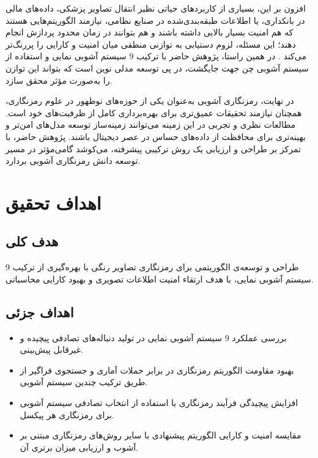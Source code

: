 افزون بر این، بسیاری از کاربردهای حیاتی نظیر انتقال تصاویر پزشکی، داده‌های مالی در بانکداری، یا اطلاعات طبقه‌بندی‌شده در صنایع نظامی، نیازمند الگوریتم‌هایی هستند که هم امنیت بسیار بالایی داشته باشند و هم بتوانند در زمان محدود پردازش انجام دهند؛ این مسئله، لزوم دستیابی به توازنی منطقی میان امنیت و کارایی را پررنگ‌تر می‌کند \cite{ref5}. در همین راستا، پژوهش حاضر با ترکیب 9 سیستم آشوبی نمایی و استفاده از سیستم آشوبی چن جهت جایگشت، در پی توسعه مدلی نوین است که بتواند این توازن را به‌صورت مؤثر محقق سازد.

در نهایت، رمزنگاری آشوبی به‌عنوان یکی از حوزه‌های نوظهور در علوم رمزنگاری، همچنان نیازمند تحقیقات عمیق‌تری برای بهره‌برداری کامل از ظرفیت‌های خود است. مطالعات نظری و تجربی در این زمینه می‌توانند زمینه‌ساز توسعه مدل‌های امن‌تر و بهینه‌تری برای محافظت از داده‌های حساس در عصر دیجیتال باشند. پژوهش حاضر، با تمرکز بر طراحی و ارزیابی یک روش ترکیبی پیشرفته، می‌کوشد گامی‌مؤثر در مسیر توسعه دانش رمزنگاری آشوبی بردارد.

\section{اهداف تحقیق}
\subsection{هدف کلی}
طراحی و توسعه‌ی الگوریتمی برای رمزنگاری تصاویر رنگی با بهره‌گیری از ترکیب 9 سیستم آشوبی نمایی، با هدف ارتقاء امنیت اطلاعات تصویری و بهبود کارایی محاسباتی.

\subsection{اهداف جزئی}
\begin{itemize}
    \item بررسی عملکرد 9 سیستم آشوبی نمایی در تولید دنباله‌های تصادفی پیچیده و غیرقابل پیش‌بینی.
    \item بهبود مقاومت الگوریتم رمزنگاری در برابر حملات آماری و جستجوی فراگیر از طریق ترکیب چندین سیستم آشوبی.
    \item افزایش پیچیدگی فرآیند رمزنگاری با استفاده از انتخاب تصادفی سیستم آشوبی برای رمزنگاری هر پیکسل.
    \item مقایسه امنیت و کارایی الگوریتم پیشنهادی با سایر روش‌های رمزنگاری مبتنی بر آشوب و ارزیابی میزان برتری آن.
\end{itemize}

